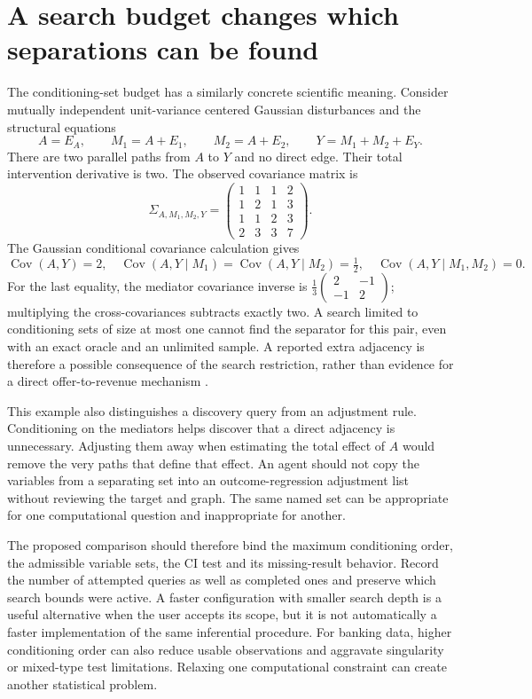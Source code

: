 \section{A search budget changes which separations can be found}
\label{exec14:l4-depth-example}

The conditioning-set budget has a similarly concrete scientific meaning.
Consider mutually independent unit-variance centered Gaussian disturbances
and the structural equations
\[
 A=E_A,\qquad M_1=A+E_1,\qquad M_2=A+E_2,
 \qquad Y=M_1+M_2+E_Y.
\]
There are two parallel paths from $A$ to $Y$ and no direct edge. Their total
intervention derivative is two. The observed covariance matrix is
\[
 \Sigma_{A,M_1,M_2,Y}=
 \begin{pmatrix}
 1&1&1&2\\1&2&1&3\\1&1&2&3\\2&3&3&7
 \end{pmatrix}.
\]
The Gaussian conditional covariance calculation gives
\[
 \operatorname{Cov}(A,Y)=2,\quad
 \operatorname{Cov}(A,Y\mid M_1)
 =\operatorname{Cov}(A,Y\mid M_2)=\tfrac12,
 \quad \operatorname{Cov}(A,Y\mid M_1,M_2)=0.
\]
For the last equality, the mediator covariance inverse is
$\frac13\left(\begin{smallmatrix}2&-1\\-1&2\end{smallmatrix}\right)$;
multiplying the cross-covariances subtracts exactly two. A search limited to
conditioning sets of size at most one cannot find the separator for this
pair, even with an exact oracle and an unlimited sample. A reported extra
adjacency is therefore a possible consequence of the search restriction,
rather than evidence for a direct offer-to-revenue mechanism
\citep{exec14_discovery_design_oracles}.

This example also distinguishes a discovery query from an adjustment rule.
Conditioning on the mediators helps discover that a direct adjacency is
unnecessary. Adjusting them away when estimating the total effect of $A$
would remove the very paths that define that effect. An agent should not copy
the variables from a separating set into an outcome-regression adjustment
list without reviewing the target and graph. The same named set can be
appropriate for one computational question and inappropriate for another.

The proposed comparison should therefore bind the maximum conditioning order,
the admissible variable sets, the CI test and its missing-result behavior.
Record the number of attempted queries as well as completed ones and preserve
which search bounds were active. A faster configuration with smaller search
depth is a useful alternative when the user accepts its scope, but it is not
automatically a faster implementation of the same inferential procedure.
For banking data, higher conditioning order can also reduce usable observations
and aggravate singularity or mixed-type test limitations. Relaxing one
computational constraint can create another statistical problem.

